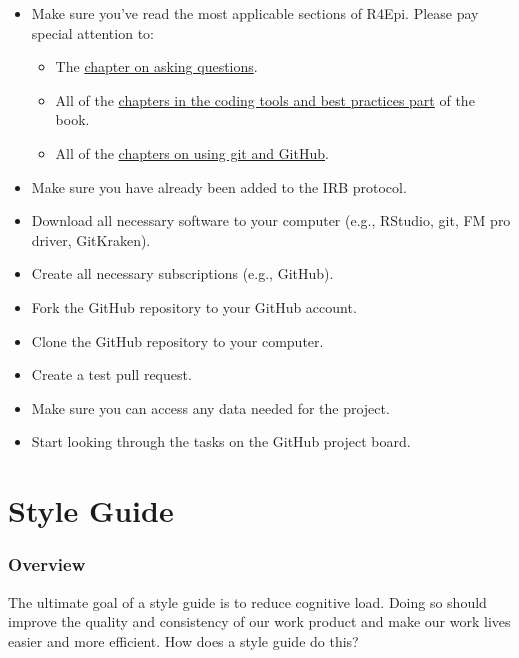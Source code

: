 \documentclass[
  letterpaper,
  DIV=11,
  numbers=noendperiod]{scrreprt}
\providecommand{\tightlist}{%
  \setlength{\itemsep}{0pt}\setlength{\parskip}{0pt}}\usepackage{longtable,booktabs,array}
\begin{document}
\begin{itemize}
\tightlist
\item
  Make sure you've read the most applicable sections of R4Epi. Please
  pay special attention to:

  \begin{itemize}
  \tightlist
  \item
    The \href{https://www.r4epi.com/asking-questions.html}{chapter on
    asking questions}.
  \item
    All of the \href{https://www.r4epi.com/r-scripts.html}{chapters in
    the coding tools and best practices part} of the book.
  \item
    All of the
    \href{https://www.r4epi.com/introduction-to-git-and-github.html}{chapters
    on using git and GitHub}.
  \end{itemize}
\item
  Make sure you have already been added to the IRB protocol.
\item
  Download all necessary software to your computer (e.g., RStudio, git,
  FM pro driver, GitKraken).
\item
  Create all necessary subscriptions (e.g., GitHub).
\item
  Fork the GitHub repository to your GitHub account.
\item
  Clone the GitHub repository to your computer.
\item
  Create a test pull request.
\item
  Make sure you can access any data needed for the project.
\item
  Start looking through the tasks on the GitHub project board.
\end{itemize}

\part{Style Guide}

\section*{Overview}\label{sec-sg_overview}


The ultimate goal of a style guide is to reduce cognitive load. Doing so
should improve the quality and consistency of our work product and make
our work lives easier and more efficient. How does a style guide do
this?
\end{document}
